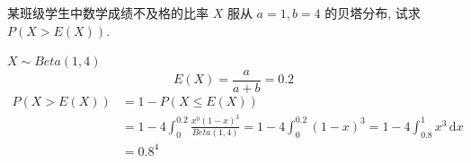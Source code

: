 \documentclass[../main.tex]{subfiles}
\begin{document}
\begin{exercise}{}{}
某班级学生中数学成绩不及格的比率 $X$ 服从 $a=1, b=4$ 的贝塔分布, 试求 $P(X>E(X))$.
\end{exercise}
\begin{solution}
  \(  X\sim Beta\left( 1,4 \right)   \) \[
  E\left( X \right)= \frac{a }{a+ b }= 0.2  
  \] \[
\begin{aligned}
  P\left( X> E\left( X \right)  \right)&= 1-P\left( X\le E\left( X \right)  \right)   \\ 
   &= 1-4\int_{0}^{0.2} \frac{x^{0}\left( 1-x \right)^{3}  }{Beta\left( 1,4 \right)  }=1-4 \int_{0}^{0.2}\left( 1-x \right)^{3}=1-4 \int_{0.8}^{1}x^{3}\,\mathrm{d} x\\ 
    &= 0.8^{4}
\end{aligned}
  \] 
\end{solution}
\end{document}
